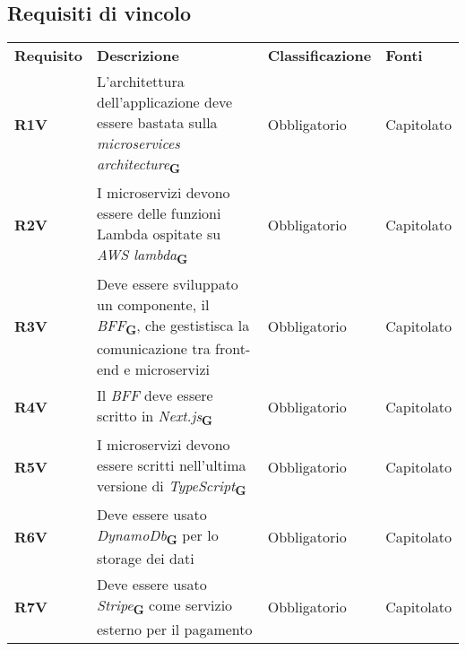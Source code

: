 \newpage
\subsection{Requisiti di vincolo}
\begin{center}
    \centering
    \renewcommand{\arraystretch}{1.8}
    \label{tab:RequisitiVincolo}
    \begin{longtable}[!h]{p{50px} p{200px} p{100px} p{50px}}
        \rowcolor{logo!70} \textbf{Requisito} & \textbf{Descrizione}                                                                                                                           & \textbf{Classificazione} & \textbf{Fonti} \\
        \textbf{R1V}                          & L'architettura dell'applicazione deve essere bastata sulla \textit{microservices architecture}\textsubscript{\textbf{G}}                       & Obbligatorio             & Capitolato     \\
        \textbf{R2V}                          & I microservizi devono essere delle funzioni \newline Lambda ospitate su \textit{AWS lambda}\textsubscript{\textbf{G}}                          & Obbligatorio             & Capitolato     \\
        \textbf{R3V}                          & Deve essere sviluppato un componente, il \textit{BFF}\textsubscript{\textbf{G}}, che gestistisca la comunicazione tra front-end e microservizi & Obbligatorio             & Capitolato     \\
        \textbf{R4V}                          & Il \textit{BFF} deve essere scritto in \textit{Next.js}\textsubscript{\textbf{G}}                                                              & Obbligatorio             & Capitolato     \\
        \textbf{R5V}                          & I microservizi devono essere scritti nell'ultima versione di \textit{TypeScript}\textsubscript{\textbf{G}}                                     & Obbligatorio             & Capitolato     \\
        \textbf{R6V}                          & Deve essere usato \textit{DynamoDb}\textsubscript{\textbf{G}} per lo storage dei dati                                                          & Obbligatorio             & Capitolato     \\
        \textbf{R7V}                          & Deve essere usato \textit{Stripe}\textsubscript{\textbf{G}} come servizio esterno per il pagamento                                             & Obbligatorio             & Capitolato     \\

\end{longtable}
\end{center}
